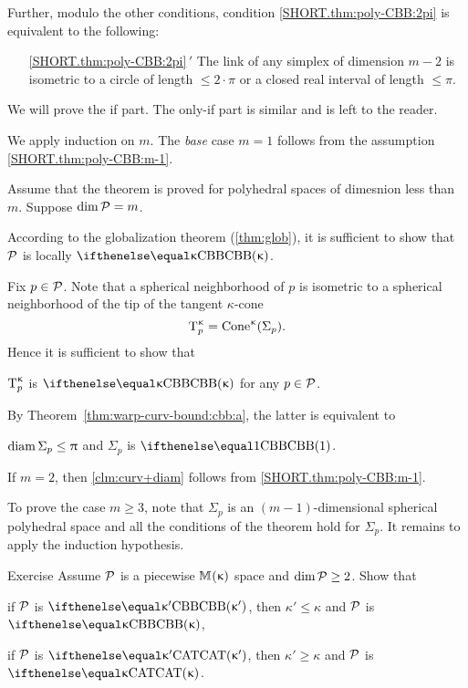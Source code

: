 Further, modulo the other conditions,
 condition \ref{SHORT.thm:poly-CBB:2pi}
is equivalent to the following:


\begin{itemize}
 \item[\ref{SHORT.thm:poly-CBB:2pi}$\,'\!$] 
The link of any simplex of dimension $m-2$ is 
isometric to a circle of length $\le 2\cdot\pi$
or a closed real interval of length $\le \pi$.
\end{itemize}

We will prove the if part.
The only-if part is similar and is left to the reader.

We apply induction on $m$.
The {}\emph{base} case $m=1$ follows from the assumption \ref{SHORT.thm:poly-CBB:m-1}.

Assume that the theorem is proved for polyhedral spaces  of dimesnion less than $m$.
Suppose  $\mathop{\rm dim}\nolimits\mathcal{P}=m$.

According to the globalization theorem (\ref{thm:glob}),
it is sufficient to show that 
$\mathcal{P}$  is locally $\Alex\kappa$. 

Fix $p\in \spc{P}$.
Note that a spherical neighborhood of $p$
is isometric
to a  spherical neighborhood of the tip of the tangent $\kappa$-cone 
$$\T_p\mc\kappa\z
=
\Cone\mc\kappa(\Sigma_p).$$
Hence it is sufficient to show that 
\begin{clm}{}
 $\text{\rm T}_p^{\upkappa}$ is $\Alex\kappa$ for any $p\in \spc{P}$.
\end{clm}

By Theorem~\ref{thm:warp-curv-bound:cbb:a}, 
the latter is equivalent to 
\begin{clm}{}\label{clm:curv+diam}
$\diam\Sigma_p\le \pi$ and $\Sigma_p$ is $\Alex1$.
\end{clm}


If $m=2$, then \ref{clm:curv+diam} follows from \ref{SHORT.thm:poly-CBB:m-1}.

To prove the case $m\ge 3$,
note that $\Sigma_p$ is an $(m-1)$-dimensional spherical polyhedral space and all the conditions of the theorem hold for $\Sigma_p$.
It remains to apply the induction hypothesis.\qeds

\begin{thm}{Exercise}\label{ex:polyKk}
Assume $\mathcal{P}$ is a piecewise
$\mathbb{M}_{{}}^{}({\upkappa})$ space and $\dim \spc{P}\ge 2$. 
Show that 

\begin{subthm}{} if $\mathcal{P}$ is $\Alex{\kappa'}$, then $\kappa'\le \kappa$ and $\mathcal{P}$ is $\Alex{\kappa}$, 
\end{subthm}

\begin{subthm}{}
if $\mathcal{P}$ is $\CAT{\kappa'}$, then $\kappa'\ge \kappa$ and $\mathcal{P}$ is $\CAT\kappa$.
\end{subthm}

\end{thm}

